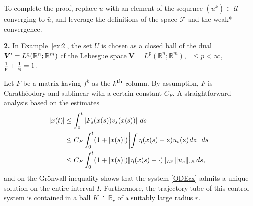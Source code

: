 \documentclass[sn-mathphys-num]{sn-jnl}
\numberwithin{equation}{section}
\theoremstyle{mythm}
\theoremstyle{mydef}
\renewcommand{\d}{\,d}
\newcommand{\R}{\mathbb{R}}
\begin{document}
To complete the proof, replace \( u \) with an element of the sequence \( (u^k) \subset \mathcal{U} \) converging to \( \bar{u} \), and leverage the definitions of the space $\bm{\mathcal F}$ and the weak* convergence.



\textbf{2.} In Example~\ref{ex:2}, the set $U$ is chosen as a closed ball of the dual $\bm V' = {L}^{\rm q}(\R^n; \R^m)$ of the Lebesgue space $\bm V = {L}^{\mathrm{p}}(\R^n; \R^m)$, $1\leq p < \infty$, $\frac{1}{\mathrm p}+\frac{1}{\rm q}=1$.

Let \( F \) be a matrix having \( f^k \) as the $k^{\mbox{\footnotesize th}}$ column. By assumption, $F$ is Carath\'{e}odory and sublinear with a certain constant $C_F$. A straightforward analysis based on the estimates
\begin{align*}
    \left|x(t)\right| &\leq \int_{0}^t \left|F_s(x(s))v_s(x(s))\right|\d s\\
    &\leq C_F \int_{0}^t (1+|x(s)|) \left|\int \eta(x(s) - {\rm x})u_s({\rm x})\d {\mathrm{x}}\right| \d{s}\\
    &\leq C_F \int_{0}^t (1+|x(s)|) \|\eta(x(s)-\cdot)\|_{L^{\mathrm p}}\,\|u_s\|_{L^{\mathrm q}} \d{s},
\end{align*}
and on the Gr\"onwall inequality shows that the system \eqref{ODEex} admits a unique solution on the entire interval \( I \). Furthermore, the trajectory tube of this control system is contained in a ball \( K \doteq \mathbb{B}_r \) of a suitably large radius \( r \). 
\end{document}
